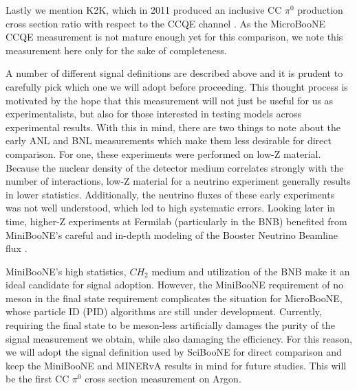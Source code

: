 \documentclass[12pt]{article}
\begin{document}
\par Lastly we mention K2K, which in 2011 produced an inclusive CC $\pi^0$ production cross section ratio with respect to the CCQE channel \cite{bib:k2k_paper}. As the MicroBooNE CCQE measurement is not mature enough yet for this comparison, we note this measurement here only for the sake of completeness.  
\par A number of different signal definitions are described above and it is prudent to carefully pick which one we will adopt before proceeding. This thought process is motivated by the hope that this measurement will not just be useful for us as experimentalists, but also for those interested in testing models across experimental results.  With this in mind, there are two things to note about the early ANL and BNL measurements which make them less desirable for direct comparison. For one, these experiments were performed on low-Z material. Because the nuclear density of the detector medium correlates strongly with the number of interactions, low-Z material for a neutrino experiment generally results in lower statistics. Additionally, the neutrino fluxes of these early experiments was not well understood, which led to high systematic errors. Looking later in time, higher-Z experiments at Fermilab (particularly in the BNB) benefited from MiniBooNE's careful and in-depth modeling of the Booster Neutrino Beamline flux \cite{bib:bnbflux}.
\par MiniBooNE's high statistics, $CH_2$ medium and utilization of the BNB make it an ideal candidate for signal adoption.  However, the MiniBooNE requirement of no meson in the final state requirement complicates the situation for MicroBooNE, whose particle ID (PID) algorithms are still under development.  Currently, requiring the final state to be meson-less artificially damages the purity of the signal measurement we obtain, while also damaging the efficiency. For this reason, we will adopt the signal definition used by SciBooNE for direct comparison and keep the MiniBooNE and MINERvA results in mind for future studies.  This will be the first CC $\pi^0$ cross section measurement on Argon.
\end{document}
